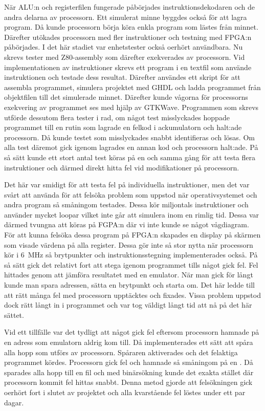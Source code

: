 \documentclass[main.tex]{subfiles}
\begin{document}
När ALU:n och registerfilen fungerade påbörjades instruktionsdekodaren och de
andra delarna av processorn. Ett simulerat minne byggdes också för att lagra
program. Då kunde processorn börja köra enkla program som lästes från minnet.
Därefter utökades processorn med fler instruktioner och testning med FPGA:n
påbörjades. I det här stadiet var enhetstester också oerhört användbara. Nu
skrevs tester med Z80-assembly som därefter exekverades av processorn. Vid
implementationen av instruktioner skrevs ett program i en textfil som använde
instruktionen och testade dess resultat. Därefter användes ett skript för att
assembla programmet, simulera projektet med GHDL och ladda programmet från
objektfilen till det simulerade minnet. Därefter kunde vågorna för processorns
exekvering av programmet ses med hjälp av GTKWave. Programmen som skrevs
utförde dessutom flera tester i rad, om något test misslyckades hoppade
programmet till en rutin som lagrade en felkod i ackumulatorn och halt:ade
processorn. Då kunde testet som misslyckades snabbt identifieras och lösas. Om
alla test däremot gick igenom lagrades en annan kod och processorn halt:ade. På
så sätt kunde ett stort antal test köras på en och samma gång för att testa
flera instruktioner och därmed direkt hitta fel vid modifikationer på
processorn.

Det här var smidigt för att testa fel på individuella instruktioner, men det
var svårt att använda för att felsöka problem som uppstod när operativsystemet
och andra program så småningom testades. Dessa kör miljontals instruktioner och
använder mycket loopar vilket inte går att simulera inom en rimlig tid. Dessa
var därmed tvungna att köras på FGPA:n där vi inte kunde se något vågdiagram.
För att kunna felsöka dessa program på FPGA:n skapades en display på skärmen
som visade värdena på alla register. Dessa gör inte så stor nytta när
processorn kör i \SI{6}{\mega\hertz} så brytpunkter och instruktionsstegning
implementerades också. På så sätt gick det relativt fort att stega igenom
programmet tills något gick fel. Fel hittades genom att jämföra resultatet med
en emulator. När man gick för långt kunde man spara adressen, sätta en
brytpunkt och starta om. Det här ledde till att rätt många fel med processorn
upptäcktes och fixades. Vissa problem uppstod dock rätt långt in i programmet
och var tog väldigt långt tid att nå på det här sättet.

Vid ett tillfälle var det tydligt att något gick fel eftersom processorn
hamnade på en adress som emulatorn aldrig kom till. Då implementerades ett sätt
att spåra alla hopp som utförs av processorn. Spåraren aktiverades och det
felaktiga programmet kördes. Processorn gick fel och hamnade så småningom på en
. Då sparades alla hopp till en fil och med binärsökning kunde det
exakta stället där processorn kommit fel hittas snabbt. Denna metod gjorde att
felsökningen gick oerhört fort i slutet av projektet och alla kvarstående fel
löstes under ett par dagar.
\end{document}
